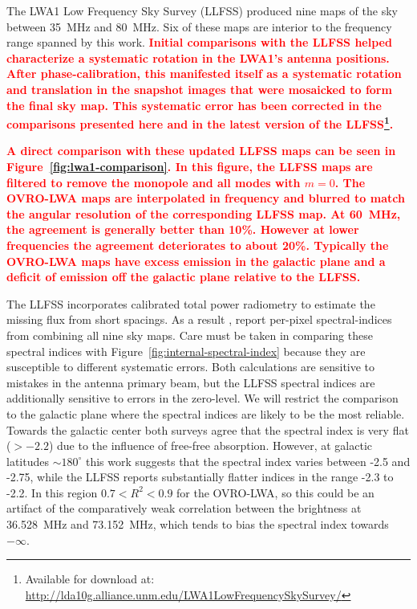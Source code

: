 \documentclass[twocolumn]{aastex61}
\newcommand{\revision}[1]{\textcolor{red}{\textbf{#1}}}
\begin{document}
The LWA1 Low Frequency Sky Survey (LLFSS) \citep{2017MNRAS.469.4537D} produced nine maps of the sky
between 35~MHz and 80~MHz. Six of these maps are interior to the frequency range spanned by this
work. \revision{Initial comparisons with the LLFSS helped characterize a systematic rotation in the
LWA1's antenna positions. After phase-calibration, this manifested itself as a systematic rotation
and translation in the snapshot images that were mosaicked to form the final sky map. This
systematic error has been corrected in the comparisons presented here and in the latest version of
the LLFSS\footnote{
    Available for download at: \url{http://lda10g.alliance.unm.edu/LWA1LowFrequencySkySurvey/}
}.}

\revision{A direct comparison with these updated LLFSS maps can be seen in
Figure~\ref{fig:lwa1-comparison}.  In this figure, the LLFSS maps are filtered to remove the
monopole and all modes with $m=0$. The OVRO-LWA maps are interpolated in frequency and blurred to
match the angular resolution of the corresponding LLFSS map.  At 60~MHz, the agreement is generally
better than 10\%. However at lower frequencies the agreement deteriorates to about 20\%.  Typically
the OVRO-LWA maps have excess emission in the galactic plane and a deficit of emission off the
galactic plane relative to the LLFSS.}

The LLFSS incorporates calibrated total power radiometry to estimate the missing flux from short
spacings. As a result \citet{2017MNRAS.469.4537D}, report per-pixel spectral-indices from combining
all nine sky maps. Care must be taken in comparing these spectral indices with
Figure~\ref{fig:internal-spectral-index} because they are susceptible to different systematic
errors. Both calculations are sensitive to mistakes in the antenna primary beam, but the LLFSS
spectral indices are additionally sensitive to errors in the zero-level. We will restrict the
comparison to the galactic plane where the spectral indices are likely to be the most reliable.
Towards the galactic center both surveys agree that the spectral index is very flat ($>-2.2$) due to
the influence of free-free absorption.  However, at galactic latitudes $\sim 180^\circ$ this work
suggests that the spectral index varies between -2.5 and -2.75, while the LLFSS reports
substantially flatter indices in the range -2.3 to -2.2. In this region $0.7 < R^2 < 0.9$ for the
OVRO-LWA, so this could be an artifact of the comparatively weak correlation between the brightness
at 36.528~MHz and 73.152~MHz, which tends to bias the spectral index towards $-\infty$.
\end{document}
